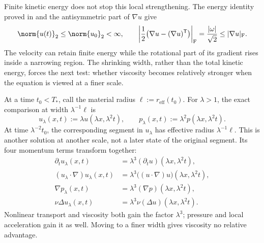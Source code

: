 Finite kinetic energy does not stop this local strengthening. The energy identity proved in  and the antisymmetric part of \(\nabla u\) give
\[
  \norm{u(t)}_2
  \leq
  \norm{u_0}_2
  <\infty,
  \qquad
  \left|\frac12\bigl(\nabla u-(\nabla u)^{\mathsf T}\bigr)\right|_{\mathrm F}
  =
  \frac{|\omega|}{\sqrt2}
  \leq
  |\nabla u|_{\mathrm F}.
\]
The velocity can retain finite energy while the rotational part of its gradient rises inside a narrowing region. The shrinking width, rather than the total kinetic energy, forces the next test: whether viscosity becomes relatively stronger when the equation is viewed at a finer scale.


At a time \(t_0<T_*\), call the material radius \(\ell:=r_{\mathrm{eff}}(t_0)\). For \(\lambda>1\), the exact \NavierStokes{} comparison at width \(\lambda^{-1}\ell\) is
\[
  u_\lambda(x,t)
  :=
  \lambda u(\lambda x,\lambda^2t),
  \qquad
  p_\lambda(x,t)
  :=
  \lambda^2p(\lambda x,\lambda^2t).
\]
At time \(\lambda^{-2}t_0\), the corresponding segment in \(u_\lambda\) has effective radius \(\lambda^{-1}\ell\). This is another solution at another scale, not a later state of the original segment. Its four momentum terms transform together:
\[
\begin{aligned}
  \partial_tu_\lambda(x,t)
  &=
  \lambda^3(\partial_tu)(\lambda x,\lambda^2t),
  \\
  (u_\lambda\cdot\nabla)u_\lambda(x,t)
  &=
  \lambda^3\bigl((u\cdot\nabla)u\bigr)(\lambda x,\lambda^2t),
  \\
  \nabla p_\lambda(x,t)
  &=
  \lambda^3(\nabla p)(\lambda x,\lambda^2t),
  \\
  \nu\Delta u_\lambda(x,t)
  &=
  \lambda^3\nu(\Delta u)(\lambda x,\lambda^2t).
\end{aligned}
\]
Nonlinear transport and viscosity both gain the factor \(\lambda^3\); pressure and local acceleration gain it as well. Moving to a finer width gives viscosity no relative advantage.


